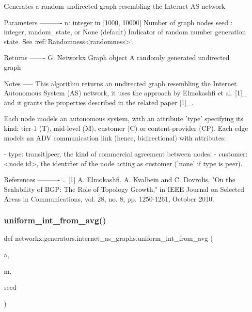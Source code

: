 \begin{DoxyVerb}Generates a random undirected graph resembling the Internet AS network

Parameters
----------
n: integer in [1000, 10000]
    Number of graph nodes
seed : integer, random_state, or None (default)
    Indicator of random number generation state.
    See :ref:`Randomness<randomness>`.

Returns
-------
G: Networkx Graph object
    A randomly generated undirected graph

Notes
-----
This algorithm returns an undirected graph resembling the Internet
Autonomous System (AS) network, it uses the approach by Elmokashfi et al.
[1]_ and it grants the properties described in the related paper [1]_.

Each node models an autonomous system, with an attribute 'type' specifying
its kind; tier-1 (T), mid-level (M), customer (C) or content-provider (CP).
Each edge models an ADV communication link (hence, bidirectional) with
attributes:

  - type: transit|peer, the kind of commercial agreement between nodes;
  - customer: <node id>, the identifier of the node acting as customer
    ('none' if type is peer).

References
----------
.. [1] A. Elmokashfi, A. Kvalbein and C. Dovrolis, "On the Scalability of
   BGP: The Role of Topology Growth," in IEEE Journal on Selected Areas
   in Communications, vol. 28, no. 8, pp. 1250-1261, October 2010.
\end{DoxyVerb}
 \mbox{\label{namespacenetworkx_1_1generators_1_1internet__as__graphs_a09f4314be4097be64da21f945dca73f3}} 
\subsubsection{\texorpdfstring{uniform\+\_\+int\+\_\+from\+\_\+avg()}{uniform\_int\_from\_avg()}}
{\footnotesize\ttfamily def networkx.\+generators.\+internet\+\_\+as\+\_\+graphs.\+uniform\+\_\+int\+\_\+from\+\_\+avg (\begin{DoxyParamCaption}\item[{}]{a,  }\item[{}]{m,  }\item[{}]{seed }\end{DoxyParamCaption})}

